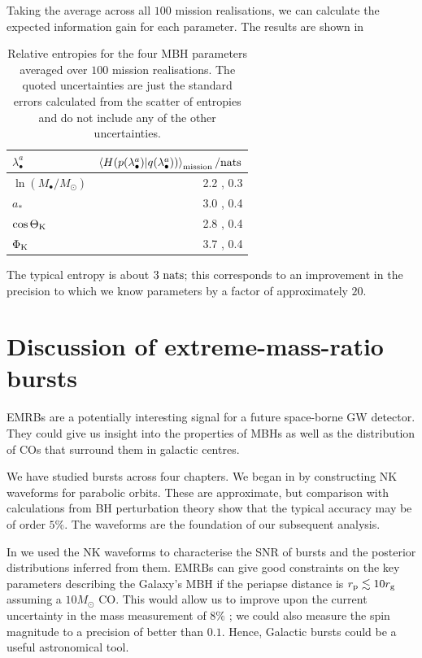 Taking the average across all $100$ mission realisations, we can calculate the expected information gain for each parameter. The results are shown in 
\begin{table}\footnotesize
\centering
  \begin{tabular}{l D{,}{\,\pm\,}{3.3}}
  \toprule
  $\lambda_\bullet^a$ &  \\ \midrule
  $\ln(M_\bullet/M_\odot)$ & 2.2 , 0.3 \\
  $a_\ast$ & 3.0 , 0.4 \\
  $\cos\Theta_\mathrm{K}$ & 2.8 , 0.4  \\
  $\Phi_\mathrm{K}$ & 3.7 , 0.4 \\
  \bottomrule
\end{tabular}
  \caption{Relative entropies for the four MBH parameters averaged over $100$ mission realisations. The quoted uncertainties are just the standard errors calculated from the scatter of entropies and do not include any of the other uncertainties.}\label{tab:entropies}
\end{table}
The typical entropy is about $3 ~\mathrm{nats}$; this corresponds to an improvement in the precision to which we know parameters by a factor of approximately $20$.

\section{Discussion of extreme-mass-ratio bursts}\label{sec:EMRB-end}

EMRBs are a potentially interesting signal for a future space-borne GW detector. They could give us insight into the properties of MBHs as well as the distribution of COs that surround them in galactic centres.

We have studied bursts across four chapters. We began in  by constructing NK waveforms for parabolic orbits. These are approximate, but comparison with calculations from BH perturbation theory show that the typical accuracy may be of order $5\%$. The waveforms are the foundation of our subsequent analysis.

In  we used the NK waveforms to characterise the SNR of bursts and the posterior distributions inferred from them. EMRBs can give good constraints on the key parameters describing the Galaxy's MBH if the periapse distance is $r_\mathrm{p} \lesssim 10 r_\mathrm{g}$ assuming a $10 M_\odot$ CO. This would allow us to improve upon the current uncertainty in the mass measurement of $8\%$ \citep{Gillessen2009}; we could also measure the spin magnitude to a precision of better than $0.1$. Hence, Galactic bursts could be a useful astronomical tool.

